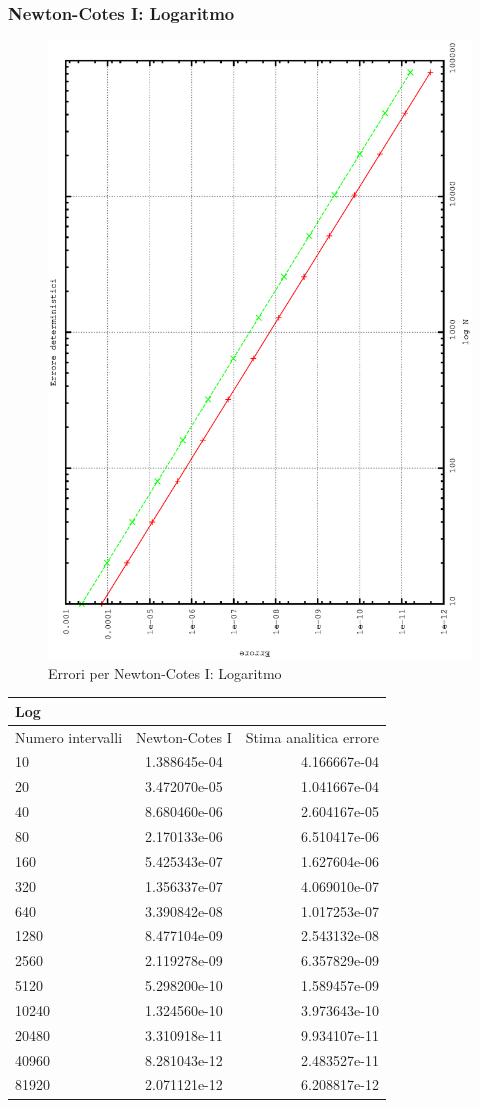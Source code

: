 \subsubsection{Newton-Cotes I: Logaritmo}
\begin{figure}[h]
\includegraphics[width=0.7\columnwidth,angle=-90]{plot_trap_log.eps}
\caption{Errori per Newton-Cotes I: Logaritmo}
\end{figure}
\begin{center}
\begin{longtable}[h]{lcr}
\toprule
Log &  \\
\midrule
Numero intervalli & Newton-Cotes I & Stima analitica errore  \\
\midrule
10 &	  1.388645e-04  	 & 4.166667e-04 \\ 
20 &	 3.472070e-05  		 & 1.041667e-04 \\ 
40 &	 8.680460e-06  		 & 2.604167e-05 \\ 
80 &	 2.170133e-06  		 & 6.510417e-06 \\ 
160 &	 5.425343e-07  		 & 1.627604e-06 \\ 
320 &	 1.356337e-07  		 & 4.069010e-07 \\ 
640 &	  3.390842e-08  	 & 1.017253e-07 \\ 
1280 &	  8.477104e-09  	 & 2.543132e-08 \\ 
2560 &	  2.119278e-09  	 & 6.357829e-09 \\ 
5120 &	  5.298200e-10  	 & 1.589457e-09 \\ 
10240 &	  1.324560e-10  	 & 3.973643e-10 \\ 
20480 &	  3.310918e-11  	 & 9.934107e-11 \\ 
40960 &	  8.281043e-12  	 & 2.483527e-11 \\ 
81920 &	  2.071121e-12  	 & 6.208817e-12 \\ 
\end{longtable}
\end{center}
